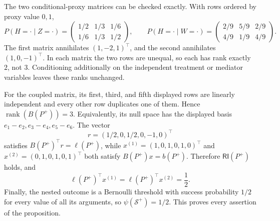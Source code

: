 The two conditional-proxy matrices can be checked exactly.  With rows ordered by
proxy value \(0,1\),
\[
 P(H=\cdot\mid Z=\cdot)=
 \begin{pmatrix}1/2&1/3&1/6\\[2pt]1/6&1/3&1/2\end{pmatrix},
 \qquad
 P(H=\cdot\mid W=\cdot)=
 \begin{pmatrix}2/9&5/9&2/9\\[2pt]4/9&1/9&4/9\end{pmatrix}.
\]
The first matrix annihilates \((1,-2,1)^\top\), and the second annihilates
\((1,0,-1)^\top\).  In each matrix the two rows are unequal, so each has rank
exactly \(2\), not \(3\).  Conditioning additionally on the independent treatment
or mediator variables leaves these ranks unchanged.

For the coupled matrix, its first, third, and fifth displayed rows are linearly
independent and every other row duplicates one of them.  Hence
\(\operatorname{rank}(B(P^+))=3\).  Equivalently, its null space has the displayed
basis \(e_1-e_2,e_3-e_4,e_5-e_6\).  The vector
\[
 r=(1/2,0,1/2,0,-1,0)^\top
\]
satisfies \(B(P^+)^\top r=\ell(P^+)\), while
\(x^{(1)}=(1,0,1,0,1,0)^\top\) and
\(x^{(2)}=(0,1,0,1,0,1)^\top\) both satisfy \(B(P^+)x=b(P^+)\).  Therefore
\(\mathsf{RI}(P^+)\) holds, and
\[
 \ell(P^+)^\top x^{(1)}=\ell(P^+)^\top x^{(2)}=\frac12.
\]
Finally, the nested outcome is a Bernoulli threshold with success probability
\(1/2\) for every value of all its arguments, so
\(\psi(\mathcal S^+)=1/2\).  This proves every assertion of the proposition.